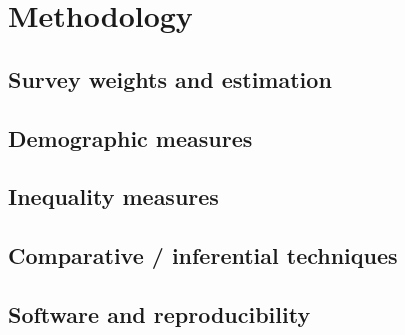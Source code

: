 \section{Methodology}
\lipsum[40]
\subsection{Survey weights and estimation}
\subsection{Demographic measures}
\subsection{Inequality measures}
\subsection{Comparative / inferential techniques}
\subsection{Software and reproducibility}